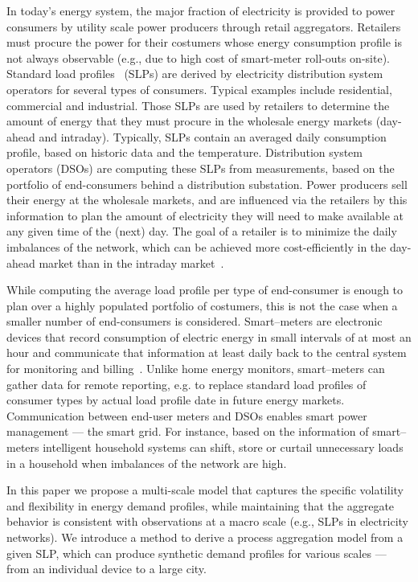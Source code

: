 \documentclass[conference]{IEEEtran}
\begin{document}
In today's energy system, the major fraction of electricity is provided to power consumers by utility scale power producers through retail aggregators. Retailers must procure the power for their costumers whose energy consumption profile is not always observable (e.g., due to high cost of smart-meter roll-outs on-site). Standard load profiles~\cite{jardini2000daily} (SLPs) are derived by electricity distribution system operators for several types of consumers. Typical examples include residential, commercial and industrial. Those SLPs are used by retailers to determine the amount of energy that they must procure in the wholesale energy markets (day-ahead and intraday). Typically, SLPs contain an averaged daily consumption profile, based on historic data and the temperature. Distribution system operators (DSOs) are computing these SLPs from measurements, based on the portfolio of end-consumers behind a distribution substation. Power producers sell their energy at the wholesale markets, and are influenced via the retailers by this information to plan the amount of electricity they will need to make available at any given time of the (next) day. The goal of a retailer is to minimize the daily imbalances of the network, which can be achieved more cost-efficiently in the day-ahead market than in the intraday market~\cite{kirschen2003demand}. %

While computing the average load profile per type of end-consumer is enough to plan over a highly populated portfolio of costumers, this is not the case when a smaller number of end-consumers is considered. Smart--meters are electronic devices that record consumption of electric energy in small intervals of at most an hour and communicate that information at least daily back to the central system for monitoring and billing~\cite{depuru2011smart}. Unlike home energy monitors, smart--meters can gather data for remote reporting, e.g. to replace standard load profiles of consumer types by actual load profile date in future energy markets. Communication between end-user meters and DSOs enables smart power management --- the smart grid. For instance, based on the information of smart--meters intelligent household systems can shift, store or curtail unnecessary loads in a household when imbalances of the network are high.

In this paper we propose a multi-scale model that captures the specific volatility and flexibility in energy demand profiles, while maintaining that the aggregate behavior is consistent with observations at a macro scale (e.g., SLPs in electricity networks). We introduce a method to derive a process aggregation model from a given SLP, which can produce synthetic demand profiles for various scales --- from an individual device to a large city. 
\end{document}

